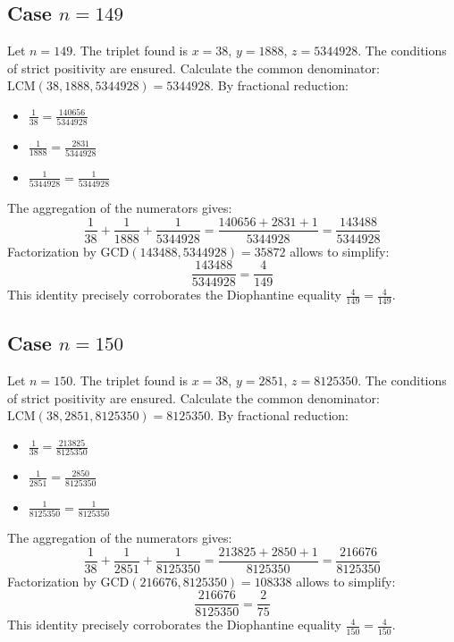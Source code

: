 \documentclass[11pt,a4paper]{article}
\begin{document}
\subsection{Case $n = 149$}
Let $n = 149$. The triplet found is $x = 38$, $y = 1888$, $z = 5344928$.
The conditions of strict positivity are ensured.
Calculate the common denominator: $\text{LCM}(38, 1888, 5344928) = 5344928$.
By fractional reduction:
\begin{itemize}
    \item $\frac{1}{38} = \frac{140656}{5344928}$
    \item $\frac{1}{1888} = \frac{2831}{5344928}$
    \item $\frac{1}{5344928} = \frac{1}{5344928}$
\end{itemize}
The aggregation of the numerators gives:
$$ \frac{1}{38} + \frac{1}{1888} + \frac{1}{5344928} = \frac{140656 + 2831 + 1}{5344928} = \frac{143488}{5344928} $$
Factorization by $\text{GCD}(143488, 5344928) = 35872$ allows to simplify:
$$ \frac{143488}{5344928} = \frac{4}{149} $$
This identity precisely corroborates the Diophantine equality $\frac{4}{149} = \frac{4}{149}$.

\subsection{Case $n = 150$}
Let $n = 150$. The triplet found is $x = 38$, $y = 2851$, $z = 8125350$.
The conditions of strict positivity are ensured.
Calculate the common denominator: $\text{LCM}(38, 2851, 8125350) = 8125350$.
By fractional reduction:
\begin{itemize}
    \item $\frac{1}{38} = \frac{213825}{8125350}$
    \item $\frac{1}{2851} = \frac{2850}{8125350}$
    \item $\frac{1}{8125350} = \frac{1}{8125350}$
\end{itemize}
The aggregation of the numerators gives:
$$ \frac{1}{38} + \frac{1}{2851} + \frac{1}{8125350} = \frac{213825 + 2850 + 1}{8125350} = \frac{216676}{8125350} $$
Factorization by $\text{GCD}(216676, 8125350) = 108338$ allows to simplify:
$$ \frac{216676}{8125350} = \frac{2}{75} $$
This identity precisely corroborates the Diophantine equality $\frac{4}{150} = \frac{4}{150}$.
\end{document}
